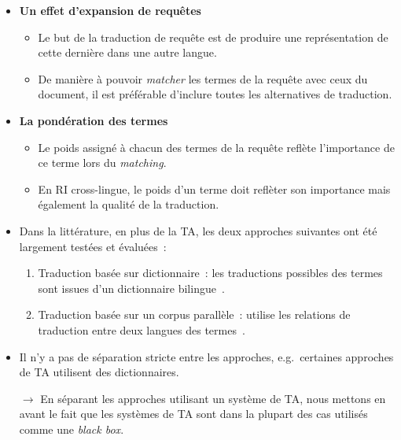 \documentclass[12pt,aspectratio=43,dvipsnames,table]{beamer}
\begin{document}
\begin{frame}[allowframebreaks]
\begin{itemize}
        \framebreak

        \item \textbf{Un effet d'expansion de requêtes}
        \begin{itemize}
            \item Le but de la traduction de requête est de produire une 
                  représentation de cette dernière dans une autre langue.
            \item De manière à pouvoir \textit{matcher} les termes de la requête
                  avec ceux du document, il est préférable d'inclure toutes les
                  alternatives de traduction.
        \end{itemize}
        \item \textbf{La pondération des termes}
        \begin{itemize}
            \item Le poids assigné à chacun des termes de la requête reflète 
                  l'importance de ce terme lors du \textit{matching}.
            \item En RI cross-lingue, le poids d'un terme doit reflèter son 
                  importance mais également la qualité de la traduction.
        \end{itemize}

        \framebreak

        \item Dans la littérature, en plus de la TA, les deux approches 
              suivantes ont été largement testées et évaluées~:
        \begin{enumerate}
            \item Traduction basée sur dictionnaire~: les traductions possibles 
                  des termes sont issues d'un dictionnaire 
                  bilingue~\cite{Pirkola:2001}.
            \item Traduction basée sur un corpus parallèle~: utilise les 
                  relations de traduction entre deux langues des 
                  termes~\cite{Chen00parallelweb}.
        \end{enumerate}
        \item Il n'y a pas de séparation stricte entre les approches, 
              e.g.~certaines approches de TA utilisent des dictionnaires.
        \item[$\to$] En séparant les approches utilisant un système de TA, nous
                     mettons en avant le fait que les systèmes de TA sont dans la
                     plupart des cas utilisés comme une \textit{black box}.
    \end{itemize}
\end{frame}
\end{document}
